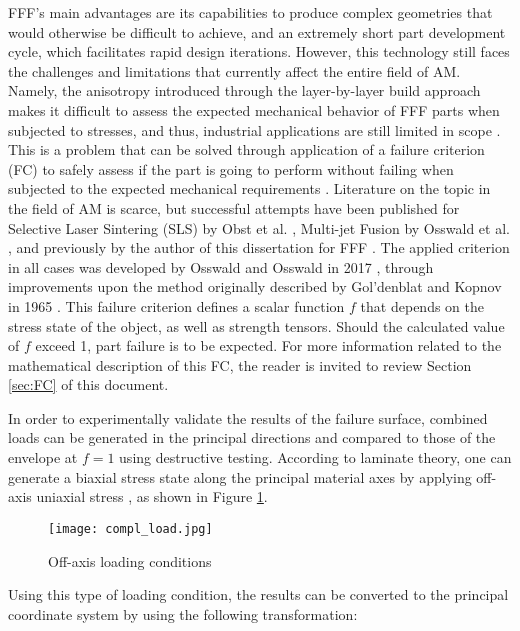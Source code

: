 \documentclass[main.tex]{subfiles}
\begin{document}
FFF's main advantages are its capabilities to produce complex geometries that would otherwise be difficult to achieve, and an extremely short part development cycle, which facilitates rapid design iterations. However, this technology still faces the challenges and limitations that currently affect the entire field of AM. Namely, the anisotropy introduced through the layer-by-layer build approach makes it difficult to assess the expected mechanical behavior of FFF parts when subjected to stresses, and thus, industrial applications are still limited in scope \cite{Gibson2015}. This is a problem that can be solved through application of a failure criterion (FC) to safely assess if the part is going to perform without failing when subjected to the expected mechanical requirements \cite{Osswald2015, Osswald2017a}.  Literature on the topic in the field of AM is scarce, but successful attempts have been published for Selective Laser Sintering (SLS) by Obst et al. \cite{Obst2018}, Multi-jet Fusion by Osswald et al. \cite{Osswald2020a}, and previously by the author of this dissertation for FFF \cite{MazzeiCapote2018, MazzeiCapote2019}. The applied criterion in all cases was developed by Osswald and Osswald in 2017 \cite{Osswald2017a}, through improvements upon the method originally described by Gol'denblat and Kopnov in 1965 \cite{Goldenblat1965}. This failure criterion defines a scalar function $f$ that depends on the stress state of the object, as well as strength tensors. Should the calculated value of $f$ exceed 1, part failure is to be expected. For more information related to the mathematical description of this FC, the reader is invited to review Section \ref{sec:FC} of this document.

In order to experimentally validate the results of the failure surface, combined loads can be generated in the principal directions and compared to those of the envelope at $f = 1$ using destructive testing. According to laminate theory, one can generate a biaxial stress state along the principal material axes by applying off-axis uniaxial stress \cite{Gibson2018}, as shown in Figure \ref{fig:offaxis}. 

\begin{figure}[!htbp]
	\center
	\texttt{[image: compl\_load.jpg]}
	\caption{Off-axis loading conditions}
	\label{fig:offaxis}
\end{figure}

Using this type of loading condition, the results can be converted to the principal coordinate system by using the following transformation:
\end{document}
